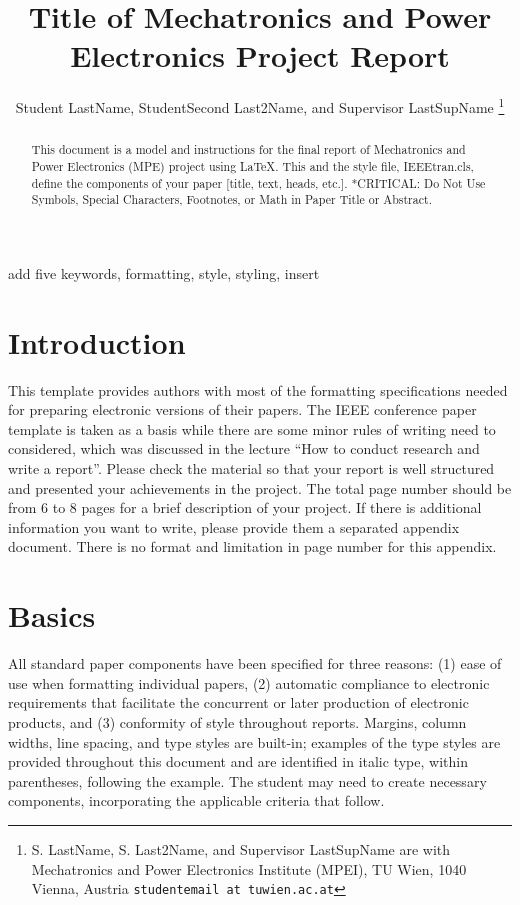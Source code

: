 \documentclass[a4paper, 10pt, conference]{ieeeconf}      %
\title{\LARGE \bf
Title of Mechatronics and Power Electronics Project Report
}
\author{Student LastName, StudentSecond Last2Name, and Supervisor LastSupName%
\thanks{ S. LastName, S. Last2Name, and Supervisor LastSupName are with Mechatronics and Power Electronics Institute (MPEI),
        TU Wien, 1040 Vienna, Austria
        {\tt\small studentemail at tuwien.ac.at}}%
}
\begin{document}
\maketitle
\thispagestyle{plain}
\pagestyle{plain}


\begin{abstract}

This document is a model and instructions for the final report of Mechatronics and Power Electronics (MPE) project using \LaTeX.
This and the style file, IEEEtran.cls, define the components of your paper [title, text, heads, etc.]. *CRITICAL: Do Not Use Symbols, Special Characters, Footnotes, 
or Math in Paper Title or Abstract. 

\end{abstract}

\begin{keywords}
add five keywords, formatting, style, styling, insert
\end{keywords}

\section{Introduction}

This template provides authors with most of the formatting specifications needed for preparing electronic versions of their papers. The IEEE conference paper template is taken as a basis while there are some minor rules of writing need to considered, which was discussed in the lecture ``How to conduct research and write a report''. Please check the material so that your report is well structured and presented your achievements in the project. The total page number should be from 6 to 8 pages for a brief description of your project. If there is additional information you want to write, please provide them a separated appendix document. There is no format and limitation in page number for this appendix. 


\section{Basics}
All standard paper components have been specified for three reasons: (1) ease of use when formatting individual papers, (2) automatic compliance to electronic requirements that facilitate the concurrent or later production of electronic products, and (3) conformity of style throughout reports. Margins, column widths, line spacing, and type styles are built-in; examples of the type styles are provided throughout this document and are identified in italic type, within parentheses, following the example. The student may need to create necessary components, incorporating the applicable criteria that follow.
\end{document}
